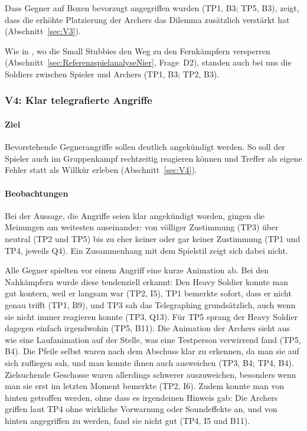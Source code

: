 \documentclass[../Main.tex]{subfiles}
\begin{document}
Dass Gegner auf Boxen bevorzugt angegriffen wurden (TP1, B3; TP5, B3), zeigt, dass die erhöhte Platzierung der Archers das Dilemma zusätzlich verstärkt hat (Abschnitt~\ref{sec:V3}).

Wie in , wo die Small Stubbies den Weg zu den Fernkämpfern versperren (Abschnitt~\ref{sec:ReferenzspielanalyseNier}, Frage~D2), standen auch bei uns die Soldiers zwischen Spieler und Archers (TP1, B3; TP2, B3).

\subsubsection{V4: Klar telegrafierte Angriffe}

\paragraph{Ziel}
Bevorstehende Gegnerangriffe sollen deutlich angekündigt werden. So soll der Spieler auch im Gruppenkampf rechtzeitig reagieren können und Treffer als eigene Fehler statt als Willkür erleben (Abschnitt~\ref{sec:V4}).

\paragraph{Beobachtungen}
Bei der Aussage, die Angriffe seien klar angekündigt worden, gingen die Meinungen am weitesten auseinander: von völliger Zustimmung (TP3) über neutral (TP2 und TP5) bis zu eher keiner oder gar keiner Zustimmung (TP1 und TP4, jeweils Q4). Ein Zusammenhang mit dem Spielstil zeigt sich dabei nicht.

Alle Gegner spielten vor einem Angriff eine kurze Animation ab. Bei den Nahkämpfern wurde diese tendenziell erkannt: Den Heavy Soldier konnte man gut kontern, weil er langsam war (TP2, I5), TP1 bemerkte sofort, dass er nicht genau trifft (TP1, B9), und TP3 sah das Telegraphing grundsätzlich, auch wenn sie nicht immer reagieren konnte (TP3, Q13). Für TP5 sprang der Heavy Soldier dagegen einfach irgendwohin (TP5, B11). Die Animation der Archers sieht aus wie eine Laufanimation auf der Stelle, was eine Testperson verwirrend fand (TP5, B4). Die Pfeile selbst waren nach dem Abschuss klar zu erkennen, da man sie auf sich zufliegen sah, und man konnte ihnen auch ausweichen (TP3, B4; TP4, B4). Zielsuchende Geschosse waren allerdings schwerer auszuweichen, besonders wenn man sie erst im letzten Moment bemerkte (TP2, I6). Zudem konnte man von hinten getroffen werden, ohne dass es irgendeinen Hinweis gab: Die Archers griffen laut TP4 ohne wirkliche Vorwarnung oder Soundeffekte an, und von hinten angegriffen zu werden, fand sie nicht gut (TP4, I5 und B11).
\end{document}
